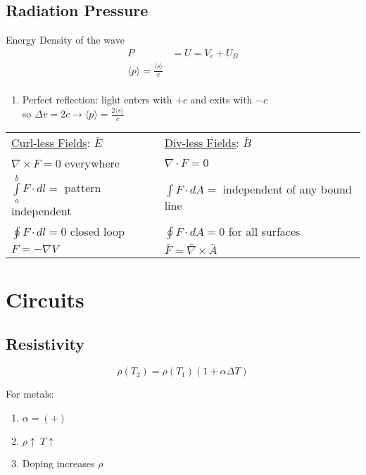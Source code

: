 \documentclass[10pt,letter]{article}
\begin{document}
\subsection{Radiation Pressure}
Energy Density of the wave
\begin{align}
  P &= U = V_e + U_B\\
  \langle p \rangle = \frac{\langle s \rangle}{c}\\
\end{align}

\begin{enumerate}
    \item Perfect reflection: light enters with $+c$ and exits with $-c$\\
        so $\Delta v = 2c \rightarrow \langle p \rangle = \frac{2 \langle s \rangle}{c}$
\end{enumerate}

\begin{tabular} {l l}
    \underline{Curl-less Fields}: $\bar{E}$ & \underline{Div-less Fields}: $\bar{B}$\\
    $\nabla \times F= 0$ everywhere & $\nabla \cdot F = 0$\\
    $\int \limits_a^b F \cdot dl = $ pattern independent & $\int F\cdot dA = $ independent of any bound line\\
    $\oint F \cdot dl = 0$ closed loop & $\oint F \cdot dA = 0 $ for all surfaces \\
    $F = -\nabla V$ & $\bar{F} = \bar{\nabla} \times \bar{A}$
\end{tabular}


\section{Circuits}

\subsection{Resistivity}
\begin{equation}
 \rho(T_2) = \rho(T_1)(1+\alpha\Delta T) 
\end{equation}

For metals:
\begin{enumerate}
  \item $\alpha = (+)$
  \item $\rho \uparrow ~ T \uparrow$
  \item Doping increases $\rho$
\end{enumerate}
\end{document}
